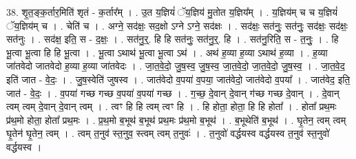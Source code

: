 \documentclass[17pt]{extarticle}
\begin{document}
38. शृ॒त॒ङ्क॒र्तार॒मिति॑ शृतं - क॒र्तार᳚म् । . उ॒त य॒ज्ञियं॑ ॅय॒ज्ञिय॑ मु॒तोत य॒ज्ञिय᳚म् । . य॒ज्ञिय॑म् च च य॒ज्ञियं॑ ॅय॒ज्ञिय॑म् च । . चेति॑ च । . अग्ने॒ सद॑क्षः॒ सद॒क्षो ऽग्ने ऽग्ने॒ सद॑क्षः । . सद॑क्षः॒ सत॑नुः॒ सत॑नुः॒ सद॑क्षः॒ सद॑क्षः॒ सत॑नुः । . सद॑क्ष॒ इति॒ स - द॒क्षः॒ । . सत॑नु॒र्॒. हि हि सत॑नुः॒ सत॑नु॒र्॒. हि । . सत॑नु॒रिति॒ स - त॒नुः॒ । . हि भू॒त्वा भू॒त्वा हि हि भू॒त्वा । . भू॒त्वा ऽथाथ॑ भू॒त्वा भू॒त्वा ऽथ॑ । . अथ॑ ह॒व्या ह॒व्या ऽथाथ॑ ह॒व्या । . ह॒व्या जा॑तवेदो जातवेदो ह॒व्या ह॒व्या जा॑तवेदः । . जा॒त॒वे॒दो॒ जु॒ष॒स्व॒ जु॒ष॒स्व॒ जा॒त॒वे॒दो॒ जा॒त॒वे॒दो॒ जु॒ष॒स्व॒ । . जा॒त॒वे॒द॒ इति॑ जात - वे॒दः॒ । . जु॒ष॒स्वेति॑ जुषस्व । . जात॑वेदो व॒पया॑ व॒पया॒ जात॑वेदो॒ जात॑वेदो व॒पया᳚ । . जात॑वेद॒ इति॒ जात॑ - वे॒दः॒ । . व॒पया॑ गच्छ गच्छ व॒पया॑ व॒पया॑ गच्छ । . ग॒च्छ॒ दे॒वान् दे॒वान् ग॑च्छ गच्छ दे॒वान् । . दे॒वान् त्वम् त्वम् दे॒वान् दे॒वान् त्वम् । . त्वꣳ हि हि त्वम् त्वꣳ हि । . हि होता॒ होता॒ हि हि होता᳚ । . होता᳚ प्रथ॒मः प्र॑थ॒मो होता॒ होता᳚ प्रथ॒मः । . प्र॒थ॒मो ब॒भूथ॑ ब॒भूथ॑ प्रथ॒मः प्र॑थ॒मो ब॒भूथ॑ । . ब॒भूथेति॑ ब॒भूथ॑ । . घृ॒तेन॒ त्वम् त्वम् घृ॒तेन॑ घृ॒तेन॒ त्वम् । . त्वम् त॒नुव॑ स्त॒नुव॒ स्त्वम् त्वम् त॒नुवः॑ । . त॒नुवो॑ वर्द्धयस्व वर्द्धयस्व त॒नुव॑ स्त॒नुवो॑ वर्द्धयस्व । \newline
\end{document}
